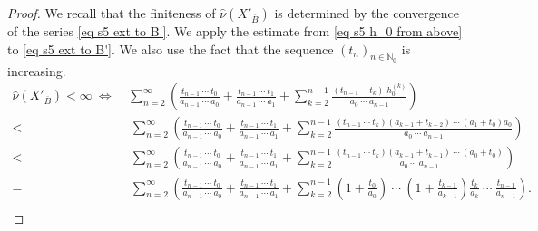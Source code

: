 \documentclass[11pt,reqno]{amsart}
\theoremstyle{definition}
\theoremstyle{remark}
\theoremstyle{plain}
\def\ol{\overline}
\def\wh{\widehat}
\newcommand{\N}{\mathbb N}
\newcommand{\ba}{\begin{aligned}}
\newcommand{\ea}{\end{aligned}}
\numberwithin{equation}{section}
\begin{document}
\begin{proof} 
We recall that the finiteness of $\wh\nu(X'_{\ol B})$ is determined by the convergence of the series \eqref{eq s5 ext to B'}.  
We apply the estimate from \eqref{eq s5 h_0 from above} to \eqref{eq s5 ext to B'}. 
We also use the fact that the sequence $(t_n)_{n \in \N_0}$ is increasing. 
$$
\ba 
\wh\nu(X'_{\ol B}) < \infty \ \Longleftrightarrow \ & \sum_{n=2}^{\infty}  \left( \frac{t_{n-1} \ \cdots\ t_{0}}{a_{n-1}\ \cdots\ a_{0}} + \frac{t_{n-1} \ \cdots\ t_{1}}{a_{n-1}\ \cdots\ a_{1}} +\sum_{k =2 }^{n-1}
\frac{(t_{n-1} \ \cdots\ t_{k})\; h_0^{(k)}}{a_0\ \cdots\ a_{n-1}}
\right)\\
< &\  \sum_{n=2}^{\infty} \left( \frac{t_{n-1} \ \cdots\ t_{0}}{a_{n-1}\ \cdots\ a_{0}} + \frac{t_{n-1} \ \cdots\ t_{1}}{a_{n-1}\ \cdots\ a_{1}} +
\sum_{k =2}^{n-1}
\frac{(t_{n-1} \ \cdots\ t_{k})(a_{k-1} + t_{k-2}) \ \cdots\ (a_1 + t_0)a_0}{a_0\ \cdots\ a_{n-1}}\right)\\
< &\  \sum_{n=2}^{\infty} \left( \frac{t_{n-1} \ \cdots\ t_{0}}{a_{n-1}\ \cdots\ a_{0}} + \frac{t_{n-1} \ \cdots\ t_{1}}{a_{n-1}\ \cdots\ a_{1}} +
\sum_{k=2}^{n-1} \frac{(t_{n-1} \ \cdots\ t_{k})(a_{k-1} + t_{k-1}) \ \cdots\ (a_0 + t_0)}{a_0\ \cdots\ a_{n-1}}\right)\\
= &\   \sum_{n=2}^{\infty} \left( \frac{t_{n-1} \ \cdots\ t_{0}}{a_{n-1}\ \cdots\ a_{0}} + \frac{t_{n-1} \ \cdots\ t_{1}}{a_{n-1}\ \cdots\ a_{1}} +
\sum_{k=2}^{n-1} 
\left(1 + \frac{t_0}{a_0}\right) \ \cdots \ \left(1 + \frac{t_{k-1}}{a_{k-1}}\right)
\frac{t_{k}}{a_{k}}\ \cdots\ \frac{t_{n-1}}{a_{n-1}}\right).\\
\ea
$$


\end{proof}
\end{document}
